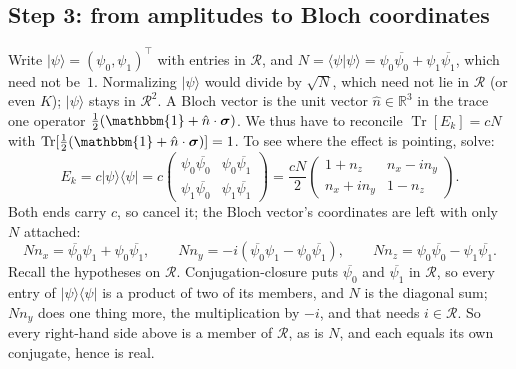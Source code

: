\documentclass[11pt,a4paper]{article}
\DeclareMathOperator{\Tr}{Tr}
\newcommand{\R}{\mathbb{R}}
\newcommand{\Id}{\mathbbm{1}}
\newcommand{\sigmavec}{\boldsymbol{\sigma}}
\newcommand{\ket}[1]{|#1\rangle}
\newcommand{\braket}[2]{\langle#1|#2\rangle}
\newcommand{\ketbra}[2]{|#1\rangle\langle#2|}
\begin{document}
\subsection{Step 3: from amplitudes to Bloch coordinates} \label{sec:decker:step3}

Write $\ket{\psi} = (\psi_0, \psi_1)^\top$ with entries in $\mathcal{R}$, and $N = \braket{\psi}{\psi} = \psi_0\overline{\psi_0} + \psi_1\overline{\psi_1}$, which need not be~$1$. Normalizing $\ket{\psi}$ would divide by $\sqrt{N}$, which need not lie in $\mathcal{R}$ (or even $K$); $\ket{\psi}$ stays in $\mathcal{R}^2$. A Bloch vector is the unit vector $\hat n \in \R^3$ in the trace one operator $\tfrac{1}{2}(\Id + \hat n \cdot \sigmavec)$. We thus have to reconcile $\Tr[E_k] = cN$ with $\Tr[\tfrac{1}{2}(\Id + \hat n \cdot \sigmavec)] = 1$. To see where the effect is pointing, solve:
\begin{equation*}
E_k = c\ketbra{\psi}{\psi} = c\begin{pmatrix} \psi_0\overline{\psi_0} & \psi_0\overline{\psi_1} \\ \psi_1\overline{\psi_0} & \psi_1\overline{\psi_1} \end{pmatrix} = \frac{cN}{2}\begin{pmatrix} 1 + n_z & n_x - i n_y \\ n_x + i n_y & 1 - n_z \end{pmatrix}.
\end{equation*}
Both ends carry $c$, so cancel it; the Bloch vector's coordinates are left with only $N$ attached:
\begin{equation*}
N n_x = \overline{\psi_0}\psi_1 + \psi_0\overline{\psi_1}, \qquad N n_y = -i(\overline{\psi_0}\psi_1 - \psi_0\overline{\psi_1}), \qquad N n_z = \psi_0\overline{\psi_0} - \psi_1\overline{\psi_1}.
\end{equation*}
Recall the hypotheses on $\mathcal{R}$. Conjugation-closure puts $\overline{\psi_0}$ and $\overline{\psi_1}$ in $\mathcal{R}$, so every entry of $\ketbra{\psi}{\psi}$ is a product of two of its members, and $N$ is the diagonal sum; $N n_y$ does one thing more, the multiplication by $-i$, and that needs $i \in \mathcal{R}$. So every right-hand side above is a member of $\mathcal{R}$, as is $N$, and each equals its own conjugate, hence is real.
\end{document}
